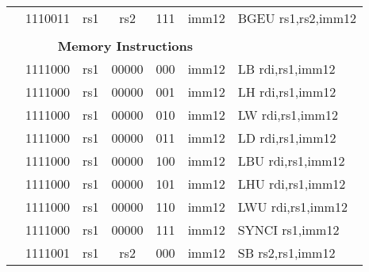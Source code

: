 \begin{table}[p]
\begin{small}
\begin{center}
\begin{tabular}{rcccccccccl}
&
\multicolumn{2}{|c|}{1110011} &
\multicolumn{1}{c|}{rs1} &
\multicolumn{1}{c|}{rs2} &
\multicolumn{1}{c|}{111} &
\multicolumn{4}{c|}{imm12} & BGEU rs1,rs2,imm12 \\
\cline{2-10}
  

&
\multicolumn{9}{c}{} & \\
&
\multicolumn{9}{c}{\bf Memory Instructions} & \\
\cline{2-10}
  

&
\multicolumn{2}{|c|}{1111000} &
\multicolumn{1}{c|}{rs1} &
\multicolumn{1}{c|}{00000} &
\multicolumn{1}{c|}{000} &
\multicolumn{4}{c|}{imm12} & LB rdi,rs1,imm12 \\
\cline{2-10}
  

&
\multicolumn{2}{|c|}{1111000} &
\multicolumn{1}{c|}{rs1} &
\multicolumn{1}{c|}{00000} &
\multicolumn{1}{c|}{001} &
\multicolumn{4}{c|}{imm12} & LH rdi,rs1,imm12 \\
\cline{2-10}
  

&
\multicolumn{2}{|c|}{1111000} &
\multicolumn{1}{c|}{rs1} &
\multicolumn{1}{c|}{00000} &
\multicolumn{1}{c|}{010} &
\multicolumn{4}{c|}{imm12} & LW rdi,rs1,imm12 \\
\cline{2-10}
  

&
\multicolumn{2}{|c|}{1111000} &
\multicolumn{1}{c|}{rs1} &
\multicolumn{1}{c|}{00000} &
\multicolumn{1}{c|}{011} &
\multicolumn{4}{c|}{imm12} & LD rdi,rs1,imm12 \\
\cline{2-10}
  

&
\multicolumn{2}{|c|}{1111000} &
\multicolumn{1}{c|}{rs1} &
\multicolumn{1}{c|}{00000} &
\multicolumn{1}{c|}{100} &
\multicolumn{4}{c|}{imm12} & LBU rdi,rs1,imm12 \\
\cline{2-10}
  

&
\multicolumn{2}{|c|}{1111000} &
\multicolumn{1}{c|}{rs1} &
\multicolumn{1}{c|}{00000} &
\multicolumn{1}{c|}{101} &
\multicolumn{4}{c|}{imm12} & LHU rdi,rs1,imm12 \\
\cline{2-10}
  

&
\multicolumn{2}{|c|}{1111000} &
\multicolumn{1}{c|}{rs1} &
\multicolumn{1}{c|}{00000} &
\multicolumn{1}{c|}{110} &
\multicolumn{4}{c|}{imm12} & LWU rdi,rs1,imm12 \\
\cline{2-10}
  

&
\multicolumn{2}{|c|}{1111000} &
\multicolumn{1}{c|}{rs1} &
\multicolumn{1}{c|}{00000} &
\multicolumn{1}{c|}{111} &
\multicolumn{4}{c|}{imm12} & SYNCI rs1,imm12 \\
\cline{2-10}
  

&
\multicolumn{2}{|c|}{1111001} &
\multicolumn{1}{c|}{rs1} &
\multicolumn{1}{c|}{rs2} &
\multicolumn{1}{c|}{000} &
\multicolumn{4}{c|}{imm12} & SB rs2,rs1,imm12 \\
\cline{2-10}
  


\end{tabular}
\end{center}
\end{small}
\end{table}
